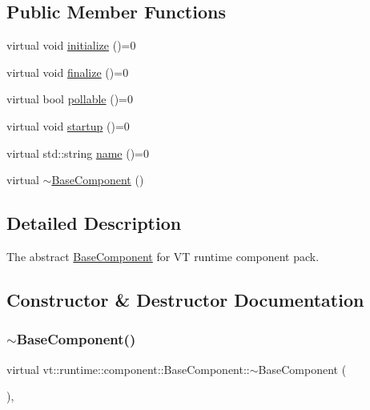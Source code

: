 \subsection*{Public Member Functions}
\begin{DoxyCompactItemize}
\item 
virtual void \hyperlink{structvt_1_1runtime_1_1component_1_1_base_component_ae361291ee8a37325580e59fb4030bc3a}{initialize} ()=0
\item 
virtual void \hyperlink{structvt_1_1runtime_1_1component_1_1_base_component_ac03e2177ad2e26b1b8cb94c7e47e3eff}{finalize} ()=0
\item 
virtual bool \hyperlink{structvt_1_1runtime_1_1component_1_1_base_component_ab651a49e6d4d3d8ca9e82a6b4b10af66}{pollable} ()=0
\item 
virtual void \hyperlink{structvt_1_1runtime_1_1component_1_1_base_component_a8bf92f9f0a7027abf7deaefa2e7f5202}{startup} ()=0
\item 
virtual std\+::string \hyperlink{structvt_1_1runtime_1_1component_1_1_base_component_a7701485f3539f78d42e6bad47fc7eb78}{name} ()=0
\item 
virtual \hyperlink{structvt_1_1runtime_1_1component_1_1_base_component_a9190b5cb499f9cfdacc1e0bd98a1805a}{$\sim$\+Base\+Component} ()
\end{DoxyCompactItemize}


\subsection{Detailed Description}
The abstract {\ttfamily \hyperlink{structvt_1_1runtime_1_1component_1_1_base_component}{Base\+Component}} for VT runtime component pack. 

\subsection{Constructor \& Destructor Documentation}
\mbox{\label{structvt_1_1runtime_1_1component_1_1_base_component_a9190b5cb499f9cfdacc1e0bd98a1805a}} 
\subsubsection{\texorpdfstring{$\sim$\+Base\+Component()}{~BaseComponent()}}
{\footnotesize\ttfamily virtual vt\+::runtime\+::component\+::\+Base\+Component\+::$\sim$\+Base\+Component (\begin{DoxyParamCaption}{ }\end{DoxyParamCaption})\hspace{0.3cm}{\ttfamily [inline]}, {\ttfamily [virtual]}}




